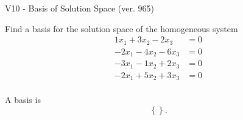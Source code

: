 \begin{exercise}
  \begin{exerciseTitle}V10 - Basis of Solution Space (ver. 965)\end{exerciseTitle}
  \begin{exerciseStatement}
    Find a basis for the solution space of the homogeneous system 
\begin{align*}
 1 x_ 1 + 3 x_ 2 -2 x_ 3 &= 0  \\ 
  -2 x_ 1 -4 x_ 2 -6 x_ 3 &= 0  \\ 
  -3 x_ 1 -1 x_ 2 + 2 x_ 3 &= 0  \\ 
  -2 x_ 1 + 5 x_ 2 + 3 x_ 3 &= 0  \\ 
 \end{align*}


 
  \end{exerciseStatement}

  \begin{exerciseAnswer}
   A basis is   
\[\left\{\right\}.\]

  


  \end{exerciseAnswer}
\end{exercise}